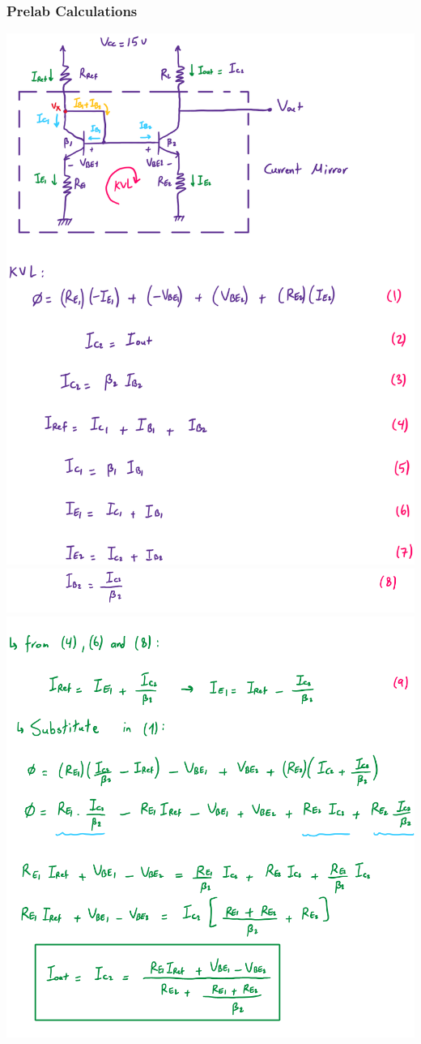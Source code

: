 \documentclass{article}
\begin{document}
	\subsubsection{Prelab Calculations}
	\includegraphics[width=\linewidth]{prelab6.png}
	\includegraphics[width=\linewidth]{prelab7.png}
	\includegraphics[width=\linewidth]{prelab8.png}
\end{document}
